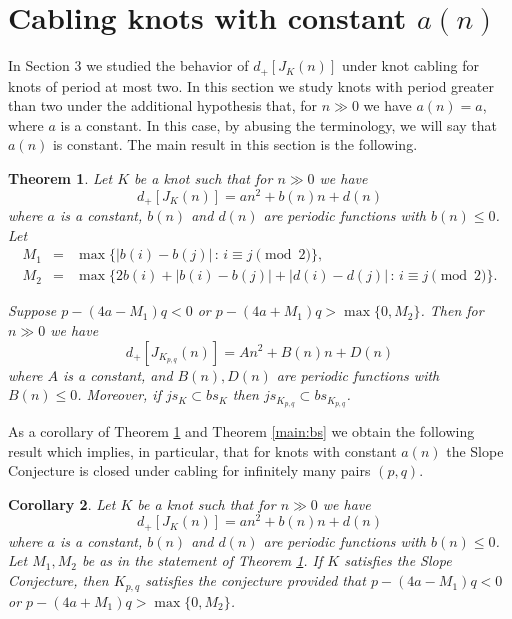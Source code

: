 \documentclass[11pt]{amsart}
\newtheorem{theorem}{Theorem}[section]
\newtheorem{corollary}[theorem]{Corollary}
\theoremstyle{definition}
\newcommand{\K}{{K_{p, q}}}
\begin{document}
\section{Cabling knots with constant $a(n)$} 

\label{constant a(n)}

In Section 3 we studied the behavior of $d_+[J_K(n)]$ under knot cabling for knots of period at most two. In this section we study knots with period greater than two under the additional hypothesis
that, for $n \gg 0$ we have $a(n)=a$, where $a$ is a constant.
In this case, by abusing the terminology, we will say that $a(n)$ is constant. The main result in this section is the following.

 \begin{theorem}
 \label{thm-quasi-constant}
 Let $K$ be a knot such that for $n \gg 0$ we have
$$
d_+[J_K(n)]=an^2+b(n)n+d(n)
$$
where $a$ is a constant, $b(n)$ and $d(n)$ are periodic functions with $b(n) \le 0$. Let \begin{eqnarray*}
M_1 &=&  \max\{|b(i)-b(j)| \, : \,  i \equiv j \pmod{2}\},\\
M_2 &=& \max\{2b(i) + |b(i)-b(j)| + |d(i)-d(j)| \, : \, i \equiv j \pmod{2}\}.
\end{eqnarray*}

Suppose $p- (4a-M_1)q < 0$ or $p- (4a + M_1)q > \max\{0,M_2\}$. Then for $n \gg 0$ we have
$$d_+[J_{\K}(n)]=An^2+B(n)n+D(n)$$
where $A$ is a constant, and $B(n), D(n)$ are periodic functions with $B(n) \le 0$. Moreover, if $js_K \subset bs_K$ then $js_{\K} \subset bs_{\K}$.
 \end{theorem}
 
 As a corollary of Theorem \ref{thm-quasi-constant} and Theorem \ref{main:bs}  we obtain the following result which implies, in particular, that for knots with constant $a(n)$ the Slope Conjecture 
 is closed under cabling for infinitely many pairs $(p, q)$.
 \begin{corollary} \label{cables-a}
 Let $K$ be a knot such that for $n \gg 0$ we have
$$
d_+[J_K(n)]=an^2+b(n)n+d(n)
$$
where $a$ is a constant, $b(n)$ and $d(n)$ are periodic functions with $b(n) \le 0$. Let $M_1, M_2$
be as in the statement of Theorem \ref{thm-quasi-constant}.
If $K$ satisfies the Slope Conjecture,  then
$\K$ satisfies the conjecture  provided that  $p- (4a-M_1)q < 0$ or $p- (4a + M_1)q > \max\{0,M_2\}$. 
 \end{corollary}
\smallskip
 
\end{document}
